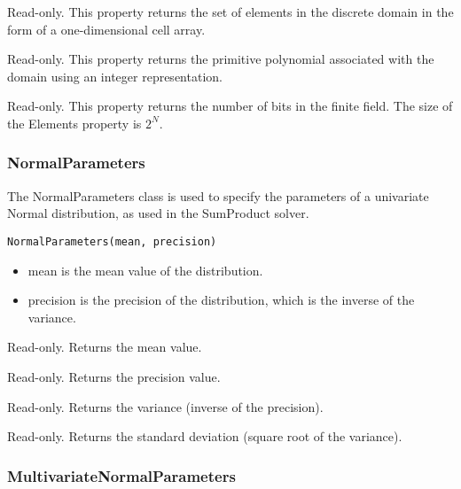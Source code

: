 

Read-only.  This property returns the set of elements in the discrete domain in the form of a one-dimensional \ifmatlab cell \fi array.


Read-only.  This property returns the primitive polynomial associated with the domain using an integer representation.


Read-only.  This property returns the number of bits in the finite field.  The size of the Elements property is $2^{N}$.




\subsubsection{NormalParameters}
\label{sec:NormalParameters}

The NormalParameters class is used to specify the parameters of a univariate Normal distribution, as used in the SumProduct solver.


\begin{lstlisting}
NormalParameters(mean, precision)
\end{lstlisting}

\begin{itemize}
\item mean is the mean value of the distribution.
\item precision is the precision of the distribution, which is the inverse of the variance.
\end{itemize}




Read-only.  Returns the mean value.


Read-only.  Returns the precision value.


Read-only.  Returns the variance (inverse of the precision).


Read-only.  Returns the standard deviation (square root of the variance).




\subsubsection{MultivariateNormalParameters}
\label{sec:MultivariateNormalParameters}

